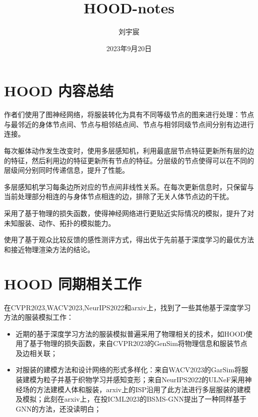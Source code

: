 \documentclass[a4paper, notitlepage, twocolumn]{article}
\title{HOOD-notes}
\author{刘宇宸}
\date{2023年9月20日}
\begin{document}
\maketitle

\section{HOOD 内容总结}
\par
作者们使用了图神经网络，将服装转化为具有不同等级节点的图来进行处理：节点与最邻近的身体节点间、节点与相邻结点间、节点与相邻同级节点间分别有边进行连接。
\par
每次躯体动作发生改变时，使用多层感知机，利用最底层节点特征更新所有层的边的特征，然后利用边的特征更新所有节点的特征。分层级的节点使得可以在不同的层级间分别同时传递信息，提升了性能。
\par
多层感知机学习每条边所对应的节点间非线性关系。在每次更新信息时，只保留与当前处理部分相连的与身体节点相连的边，排除了无关人体节点边的干扰。
\par
采用了基于物理的损失函数，使得神经网络进行更贴近实际情况的模拟，提升了对未知服装、动作、拓扑的模拟能力。
\par
使用了基于观众比较反馈的感性测评方式，得出优于先前基于深度学习的最优方法和接近物理渲染方法的结论。
\section{HOOD 同期相关工作}
\par
在CVPR2023,WACV2023,NeurIPS2022和arxiv上，找到了一些其他基于深度学习方法的服装模拟工作：
\begin{itemize}
    \item 近期的基于深度学习方法的服装模拟普遍采用了物理相关的技术，如HOOD使用了基于物理的损失函数，来自CVPR2023的GenSim将物理信息和服装节点及边相关联；
    \item 对服装的建模方法和设计网络的形式多样化：来自WACV2023的GarSim将服装建模为粒子并基于织物学习并感知变形；来自NeurIPS2022的ULNeF采用神经场的方法建模人体和服装，arxiv上的ISP沿用了此方法进行多层服装的建模及模拟；此刻在arxiv上，在投ICML2023的BSMS-GNN提出了一种同样基于GNN的方法，还没读明白；
\end{itemize}
\end{document}
